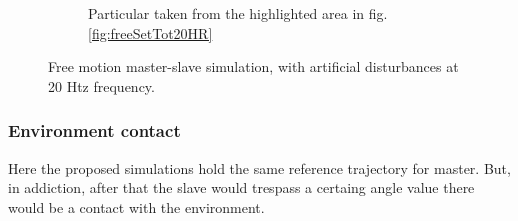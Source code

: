 \begin{figure}
\begin{subfigure}[h!]{1\linewidth}
		\caption{Particular taken from the highlighted area in fig.\ref{fig:freeSetTot20HR}}
		\label{fig:freeSetPar20HR}
	\end{subfigure}	
  \caption{ Free motion master-slave simulation, with artificial disturbances at
    20 Htz frequency.}
\end{figure}


\subsubsection{Environment contact }

Here the proposed simulations hold the same reference trajectory for master.
But, in addiction, after that the slave would trespass a certaing angle value
there would be a contact with the environment.









